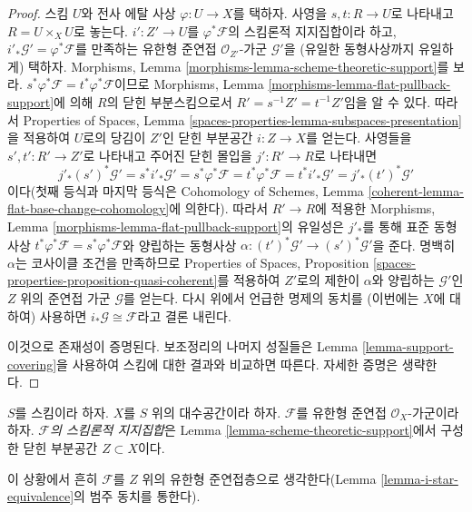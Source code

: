 \begin{proof}
스킴 $U$와 전사 에탈 사상 $\varphi : U \to X$를 택하자.
사영을 $s, t : R \to U$로 나타내고 $R = U \times_X U$로 놓는다.
$i' : Z' \to U$를 $\varphi^*\mathcal{F}$의 스킴론적 지지집합이라
하고, $i'_*\mathcal{G}' = \varphi^*\mathcal{F}$를 만족하는
유한형 준연접 $\mathcal{O}_{Z'}$-가군 $\mathcal{G}'$을
(유일한 동형사상까지 유일하게) 택하자. Morphisms, Lemma
\ref{morphisms-lemma-scheme-theoretic-support}를 보라.
$s^*\varphi^*\mathcal{F} = t^*\varphi^*\mathcal{F}$이므로
Morphisms, Lemma \ref{morphisms-lemma-flat-pullback-support}에 의해
$R$의 닫힌 부분스킴으로서
$R' = s^{-1}Z' = t^{-1}Z'$임을 알 수 있다.
따라서 Properties of Spaces, Lemma
\ref{spaces-properties-lemma-subspaces-presentation}을 적용하여
$U$로의 당김이 $Z'$인 닫힌 부분공간 $i : Z \to X$를 얻는다.
사영들을 $s', t' : R' \to Z'$로 나타내고 주어진 닫힌 몰입을
$j' : R' \to R$로 나타내면
$$
j'_* (s')^*\mathcal{G}' = s^* i'_*\mathcal{G}' =
s^*\varphi^*\mathcal{F} = t^*\varphi^*\mathcal{F} =
t^*i'_*\mathcal{G}' = j'_*(t')^*\mathcal{G}'
$$
이다(첫째 등식과 마지막 등식은 Cohomology of Schemes, Lemma
\ref{coherent-lemma-flat-base-change-cohomology}에 의한다).
따라서 $R' \to R$에 적용한 Morphisms, Lemma
\ref{morphisms-lemma-flat-pullback-support}의 유일성은
$j'_*$를 통해 표준 동형사상
$t^*\varphi^*\mathcal{F} = s^*\varphi^*\mathcal{F}$와 양립하는
동형사상 $\alpha : (t')^*\mathcal{G}' \to (s')^*\mathcal{G}'$을 준다.
명백히 $\alpha$는 코사이클 조건을 만족하므로 Properties of Spaces,
Proposition \ref{spaces-properties-proposition-quasi-coherent}를
적용하여 $Z'$로의 제한이 $\alpha$와 양립하는 $\mathcal{G}'$인
$Z$ 위의 준연접 가군 $\mathcal{G}$를 얻는다.
다시 위에서 언급한 명제의 동치를 (이번에는 $X$에 대하여) 사용하면
$i_*\mathcal{G} \cong \mathcal{F}$라고 결론 내린다.

\medskip\noindent
이것으로 존재성이 증명된다. 보조정리의 나머지 성질들은
Lemma \ref{lemma-support-covering}을 사용하여 스킴에 대한 결과와
비교하면 따른다. 자세한 증명은 생략한다.
\end{proof}

\begin{definition}
\label{definition-scheme-theoretic-support}
$S$를 스킴이라 하자. $X$를 $S$ 위의 대수공간이라 하자.
$\mathcal{F}$를 유한형 준연접 $\mathcal{O}_X$-가군이라 하자.
{\it $\mathcal{F}$의 스킴론적 지지집합}은 Lemma
\ref{lemma-scheme-theoretic-support}에서 구성한 닫힌 부분공간
$Z \subset X$이다.
\end{definition}

\noindent
이 상황에서 흔히 $\mathcal{F}$를 $Z$ 위의 유한형 준연접층으로
생각한다(Lemma \ref{lemma-i-star-equivalence}의 범주 동치를 통한다).

